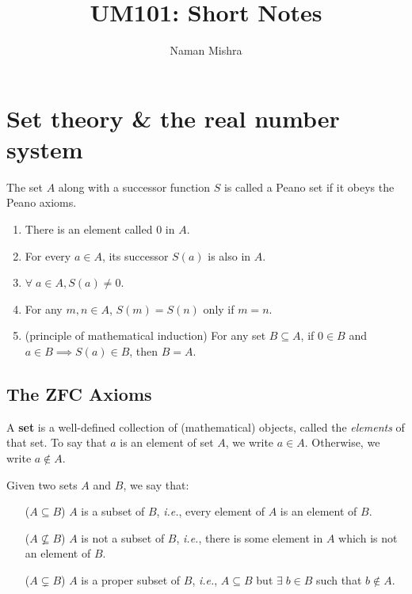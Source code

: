 \documentclass[12pt]{article}
\title{UM101: Short Notes}
\author{Naman Mishra}
\begin{document}
\maketitle

\section{Set theory \& the real number system}

\begin{defn} \label{defn:peano}
    The set $A$ along with a successor function $S$ is called a Peano set if it obeys the Peano axioms.
    \begin{enumerate}[label=(P\arabic*)]
        \item \label{defn:peano:zero}
            There is an element called 0 in $A$.
        \item \label{defn:peano:succ}
            For every $a \in A$, its successor $S(a)$ is also in $A$.
        \item \label{defn:peano:not_succ}
            $\forall \; a \in A, S(a) \neq 0$.
        \item \label{defn:peano:injective}
            For any $m, n \in A$, $S(m) = S(n)$ only if $m = n$.
        \item \label{defn:peano:induction}
            (principle of mathematical induction) For any set $B \subseteq A$, if $0 \in B$ and $a \in B \implies S(a) \in B$, then $B = A$.
    \end{enumerate}
\end{defn}

\subsection{The ZFC Axioms}

\begin{defn} \label{defn:set}
    A \textbf{set} is a well-defined collection of (mathematical) objects, called the \emph{elements} of that set.
    To say that $a$ is an element of set $A$, we write $a \in A$.
    Otherwise, we write $a \notin A$.

    Given two sets $A$ and $B$, we say that:
    \begin{enumerate}[wide]
        \item[($A \subseteq B$)] $A$ is a subset of $B$, \textit{i.e.}, every element of $A$ is an element of $B$.
        \item[($A \not\subseteq B$)] $A$ is not a subset of $B$, \textit{i.e.}, there is some element in $A$ which is not an element of $B$.
        \item[($A \subsetneq B$)] $A$ is a proper subset of $B$, \textit{i.e.}, $A \subseteq B$ but $\exists\; b \in B$ such that $b \notin A$.
    \end{enumerate}
\end{defn}
\end{document}
